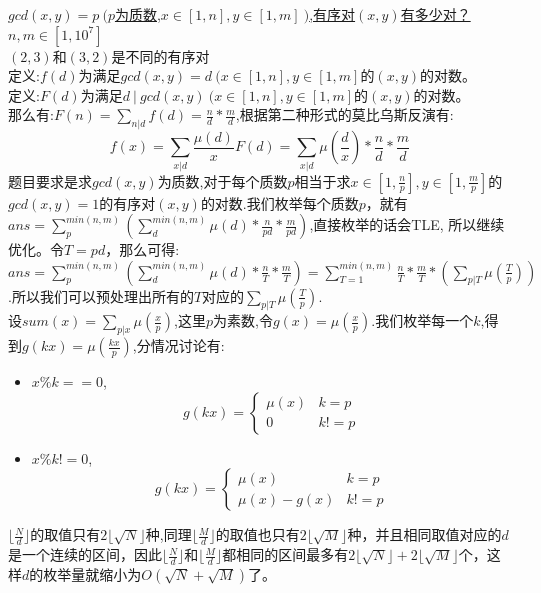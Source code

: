 \underline {$gcd(x,y)=p\ (p$为质数,$x\in[1,n],y\in[1,m]\ )$,有序对$(x,y)$有多少对？$n,m\in [1,10^7]$} \\

$(2, 3)$和$(3,2)$是不同的有序对 \\
定义:$f(d)$为满足$gcd(x,y)=d\ (x\in [1,n],y\in[1,m]$的$(x,y)$的对数。 \\
定义:$F(d)$为满足$d\ |\ gcd(x,y)\ (x\in [1,n],y\in[1, m]$的$(x,y)$的对数。 \\
那么有:$F(n) = \sum_{n|d}f(d)=\frac{n}{d}*\frac{m}{d}$,根据第二种形式的莫比乌斯反演有: \\ $$f(x)=\sum_{x|d}\frac{\mu(d)}{x}F(d)=\sum_{x|d}\mu(\frac{d}{x})*\frac{n}{d}*\frac{m}{d}$$
题目要求是求$gcd(x,y)$为质数,对于每个质数$p$相当于求$x\in [1,\frac{n}{p}],y \in [1,\frac{m}{p}]$的$gcd(x,y)=1$的有序对$(x,y)$的对数.我们枚举每个质数$p$，就有$ans = \sum_{p}^{min(n,m)}(\sum_{d}^{min(n,m)}\mu(d)*\frac{n}{pd}*\frac{m}{pd})$,直接枚举的话会TLE, 所以继续优化。令$T= pd$，那么可得:$ans=\sum_{p}^{min(n,m)}(\sum_{d}^{min(n,m)}\mu(d) * \frac{n}{T}*\frac{m}{T})=\sum_{T=1}^{min(n,m)}\frac{n}{T}*\frac{m}{T}*(\sum_{p|T}\mu(\frac{T}{p}))$.所以我们可以预处理出所有的$T$对应的$\sum_{p|T}\mu(\frac{T}{p})$.\\
设$sum(x)=\sum_{p|x}\mu({\frac{x}{p}})$,这里$p$为素数,令$g(x)=\mu(\frac{x}{p})$.我们枚举每一个$k$,得到$g(kx)=\mu(\frac{kx}{p})$,分情况讨论有: \\
\begin{itemize}
\item $x \% k == 0$,\[ g(kx)=
\begin{cases}{}
\mu(x) &  {k = p}\\
0& {k!=p}
\end{cases}
\]
\item $x \%k != 0 $,\[ g(kx)=
\begin{cases}{}
\mu(x) &  {k = p}\\
\mu(x) - g(x)& {k!=p}
\end{cases}
\]
\end{itemize}

$\lfloor\frac{N}{d}\rfloor$的取值只有$2\lfloor\sqrt {N}\rfloor$种,同理$\lfloor\frac{M}{d}\rfloor$的取值也只有$2\lfloor\sqrt{M}\rfloor$种，并且相同取值对应的$d$是一个连续的区间，因此$\lfloor\frac{N}{d}\rfloor$和$\lfloor\frac{M}{d}\rfloor$都相同的区间最多有$2\lfloor\sqrt{N}\rfloor+2\lfloor\sqrt{M}\rfloor$个，这样$d$的枚举量就缩小为$O(\sqrt{N}+\sqrt{M})$了。

